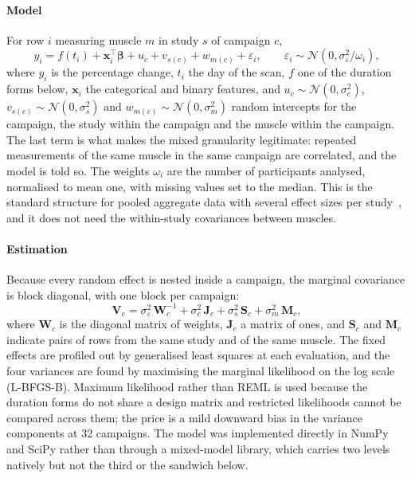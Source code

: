 \paragraph{Model} For row $i$ measuring muscle $m$ in study $s$ of campaign $c$,
\begin{equation}
  y_{i} = f(t_{i}) + \mathbf{x}_{i}^{\top}\bm{\beta} + u_{c} + v_{s(c)} + w_{m(c)} + \varepsilon_{i},
  \qquad
  \varepsilon_{i} \sim \mathcal{N}\!\left(0, \sigma^2_{\varepsilon}/\omega_{i}\right),
  \label{eq:tier1}
\end{equation}
where $y_i$ is the percentage change, $t_i$ the day of the scan, $f$ one of the duration forms below,
$\mathbf{x}_i$ the categorical and binary features, and $u_c \sim \mathcal{N}(0,\sigma^2_c)$,
$v_{s(c)} \sim \mathcal{N}(0,\sigma^2_s)$ and $w_{m(c)} \sim \mathcal{N}(0,\sigma^2_m)$ random intercepts for the
campaign, the study within the campaign and the muscle within the campaign. The last term is what makes the mixed
granularity legitimate: repeated measurements of the same muscle in the same campaign are correlated, and the model
is told so. The weights $\omega_i$ are the number of participants analysed, normalised to mean one, with missing
values set to the median. This is the standard structure for pooled aggregate data with several effect sizes per
study~\citep{assink2016,harrer2021}, and it does not need the within-study covariances between muscles.

\paragraph{Estimation} Because every random effect is nested inside a campaign, the marginal covariance is block
diagonal, with one block per campaign:
\begin{equation}
  \mathbf{V}_c = \sigma^2_{\varepsilon}\,\mathbf{W}_c^{-1} + \sigma^2_c\,\mathbf{J}_c + \sigma^2_s\,\mathbf{S}_c + \sigma^2_m\,\mathbf{M}_c ,
\end{equation}
where $\mathbf{W}_c$ is the diagonal matrix of weights, $\mathbf{J}_c$ a matrix of ones, and $\mathbf{S}_c$ and
$\mathbf{M}_c$ indicate pairs of rows from the same study and of the same muscle. The fixed effects are profiled out
by generalised least squares at each evaluation, and the four variances are found by maximising the marginal
likelihood on the log scale (L-BFGS-B). Maximum likelihood rather than REML is used because the duration forms do
not share a design matrix and restricted likelihoods cannot be compared across them; the price is a mild downward
bias in the variance components at 32 campaigns. The model was implemented directly in NumPy and SciPy rather than
through a mixed-model library, which carries two levels natively but not the third or the sandwich below.


